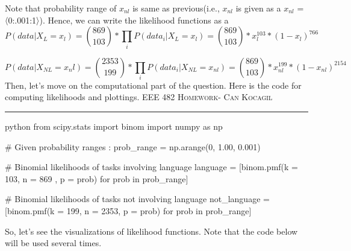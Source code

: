 \documentclass[12pt]{amsart}
\begin{document}
Note that probability range of $x_{nl}$ is same as previous(i.e., $x_{nl}$ is given as a $x_{nl}$ = 〈0:.001:1〉). Hence, we can write the likelihood functions as a
\[
P(data|X_L= x_l) = {869 \choose 103} * \prod_{i} P(data_i| X_L= x_l) = {869 \choose 103} * x_l^{103} * (1-x_l)^{766}
\]

\[
P(data|X_{NL}= {x_nl}) = {2353 \choose 199} * \prod_{i} P(data_i| X_{NL}= x_{nl}) = {869 \choose 103} * x_{nl}^{1 99} * (1-x_{nl})^{2154}
\]
Then, let’s move on the computational part of the question. Here is the code for computing likelihoods and plottings.
\newpage
{\scshape EEE 482} \hfill {\scshape \large  Homework-\relax} \hfill {\scshape Can Kocagil}
\smallskip
\hrule
\begin{mintedbox}{python}
from scipy.stats import binom
import numpy as np

# Given probability ranges :
prob_range = np.arange(0, 1.00, 0.001)

# Binomial likelihoods of tasks involving language
language = [binom.pmf(k = 103, n = 869 , p = prob) for prob in prob_range]

# Binomial likelihoods of tasks not involving language
not_language = [binom.pmf(k = 199, n = 2353, p = prob) for prob in prob_range]
\end{mintedbox}

So, let’s see the visualizations of likelihood functions. Note that the code below will be used several times.
\end{document}
